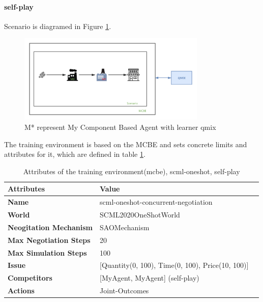 \paragraph{self-play}

Scenario is diagramed in Figure \ref{fig:scenario-oneshot-scml-self-play}.
\begin{figure}[htbp]
\centering
\includegraphics[width=0.80\textwidth]{./images/scenario-oneshot-scml-self-play.png}
\caption{M* represent My Component Based Agent with learner \gls{qmix}}
\label{fig:scenario-oneshot-scml-self-play}
\end{figure}

The training environment is based on the MCBE and sets concrete limits and attributes for it,
which are defined in table \ref{tab:attributes-mcbe-concurrent-negotiation-scml-oneshot}.

\begin{table}[htbp]
\centering
\begin{tabular}{l l l} \toprule
\bfseries \textbf{Attributes}    & \bfseries \textbf{Value}                                             \\ \midrule
\textbf{Name}                    & scml-oneshot-concurrent-negotiation                                  \\
\textbf{World}                   & SCML2020OneShotWorld                                                 \\
\textbf{Neogitation Mechanism}   & SAOMechanism                                                         \\
\textbf{Max Negotiation Steps}   & 20                                                                  \\
\textbf{Max Simulation Steps}    & 100                                                                   \\
\textbf{Issue}             	     & [Quantity(0, 100), Time(0, 100), Price(10, 100)]                     \\
\textbf{Competitors}             & [MyAgent, MyAgent] (self-play)                                       \\
\textbf{Actions}                 & Joint-Outcomes                                                             \\
\bottomrule
\end{tabular}
\caption{Attributes of the training environment(mcbe), scml-oneshot, self-play}
\label{tab:attributes-mcbe-concurrent-negotiation-scml-oneshot}
\end{table}

